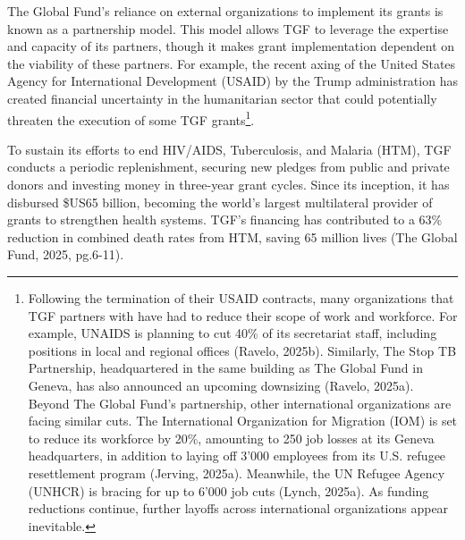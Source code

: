 \documentclass[
]{article}
\begin{document}
The Global Fund's reliance on external organizations to implement its
grants is known as a partnership model. This model allows TGF to
leverage the expertise and capacity of its partners, though it makes
grant implementation dependent on the viability of these partners. For
example, the recent axing of the United States Agency for International
Development (USAID) by the Trump administration has created financial
uncertainty in the humanitarian sector that could potentially threaten
the execution of some TGF grants\footnote{Following the termination of
  their USAID contracts, many organizations that TGF partners with have
  had to reduce their scope of work and workforce. For example, UNAIDS
  is planning to cut 40\% of its secretariat staff, including positions
  in local and regional offices (Ravelo, 2025b). Similarly, The Stop TB
  Partnership, headquartered in the same building as The Global Fund in
  Geneva, has also announced an upcoming downsizing (Ravelo, 2025a).
  Beyond The Global Fund's partnership, other international
  organizations are facing similar cuts. The International Organization
  for Migration (IOM) is set to reduce its workforce by 20\%, amounting
  to 250 job losses at its Geneva headquarters, in addition to laying
  off 3'000 employees from its U.S. refugee resettlement program
  (Jerving, 2025a). Meanwhile, the UN Refugee Agency (UNHCR) is bracing
  for up to 6'000 job cuts (Lynch, 2025a). As funding reductions
  continue, further layoffs across international organizations appear
  inevitable.}.

To sustain its efforts to end HIV/AIDS, Tuberculosis, and Malaria (HTM),
TGF conducts a periodic replenishment, securing new pledges from public
and private donors and investing money in three-year grant cycles. Since
its inception, it has disbursed \$US65 billion, becoming the world's
largest multilateral provider of grants to strengthen health systems.
TGF's financing has contributed to a 63\% reduction in combined death
rates from HTM, saving 65 million lives (The Global Fund, 2025,
pg.6-11).
\end{document}
